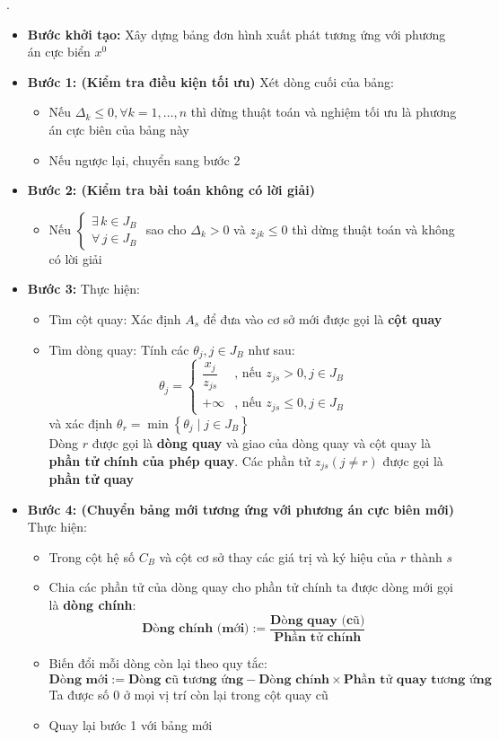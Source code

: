 \documentclass[12pt,a4paper]{article}\author{Nguyễn Nho Dũng}
\newcommand{\kniem}[1]{{\sffamily\bfseries #1}}
\newcommand{\taphop}[1]{\left\{#1\right\}}
\newcommand{\ngoacto}[1]{\left(#1\right)}
\begin{document}
\begin{thuattoan}.
	\begin{itemize}
		\item \textbf{Bước khởi tạo:} Xây dựng bảng đơn hình xuất phát tương ứng với phương án cực biển $x^0$
		\item \textbf{Bước 1: (Kiểm tra điều kiện tối ưu)} Xét dòng cuối của bảng:
		\begin{itemize}
			\item Nếu $\Delta_k \le 0, \forall k = 1,\ldots, n$ thì dừng thuật toán và nghiệm tối ưu là phương án cực biên của bảng này
			\item Nếu ngược lại, chuyển sang bước 2
		\end{itemize}
		\item \textbf{Bước 2: (Kiểm tra bài toán không có lời giải)}
		\begin{itemize}
			\item Nếu $\begin{cases}
				\exists\, k\in J_B\\
				\forall\, j\in J_B
			\end{cases}$ sao cho $\Delta_k > 0$ và $z_{jk} \le 0$ thì dừng thuật toán và không có lời giải
		\end{itemize}
		\item \textbf{Bước 3:} Thực hiện:
		\begin{itemize}
			\item Tìm cột quay: Xác định $A_s$ để đưa vào cơ sở mới được gọi là \kniem{cột quay}
			\item Tìm dòng quay: Tính các $\theta_j, j\in J_B$ như sau: $$\theta_j = \begin{cases}
				\dfrac{x_j}{z_{js}} &\text{, nếu } z_{js} > 0, j\in J_B\\
				+\infty &\text{, nếu } z_{js} \le 0, j\in J_B
			\end{cases}$$ và xác định $\theta_r = \min\taphop{\theta_j \mid j\in J_B}$\\
			Dòng $r$ được gọi là \kniem{dòng quay} và giao của dòng quay và cột quay là \kniem{phần tử chính của phép quay}. Các phần tử $z_{js}\ngoacto{j\neq r}$ được gọi là \kniem{phần tử quay}
		\end{itemize}
		\item \textbf{Bước 4: (Chuyển bảng mới tương ứng với phương án cực biên mới)} Thực hiện:
		\begin{itemize}
			\item Trong cột hệ số $C_B$ và cột cơ sở thay các giá trị và ký hiệu của $r$ thành $s$
			\item Chia các phần tử của dòng quay cho phần tử chính ta được dòng mới gọi là \kniem{dòng chính}: $$\textbf{Dòng chính (mới)} := \dfrac{\textbf{Dòng quay (cũ)}}{\textbf{Phần tử chính}}$$
			\item Biến đổi mỗi dòng còn lại theo quy tắc: $$\textbf{Dòng mới} := \textbf{Dòng cũ tương ứng} - \textbf{Dòng chính} \times \textbf{Phần tử quay tương ứng}$$ Ta được số $0$ ở mọi vị trí còn lại trong cột quay cũ
			\item Quay lại bước 1 với bảng mới
		\end{itemize}
	\end{itemize}
\end{thuattoan}
\end{document}
